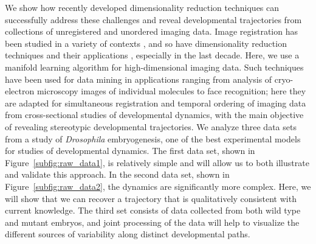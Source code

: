 \documentclass{pnastwo}
\begin{document}
\begin{article}
We show how recently developed dimensionality reduction techniques can successfully address these challenges and reveal developmental trajectories from collections of unregistered and unordered imaging data.
%
Image registration has been studied in a variety of contexts \cite{zitova2003image, rowley1998rotation, hajnal2010medical, greenspan1994rotation, zhao2003face}, and so have dimensionality reduction techniques \cite{Belkin2003, coifman2005geometric, coifman2006geometric, tenenbaum2000global, roweis2000nonlinear} and their applications \cite{anavy2014blind, trapnell2014dynamics,gupta2008extracting, qiu2011discovering, kafri2013dynamics}, especially in the last decade.
%
Here, we use a manifold learning algorithm \cite{singer2012vector} for high-dimensional imaging data.%
%
Such techniques have been used for data mining in 
applications ranging from analysis of cryo-electron microscopy images of individual molecules to face recognition; here they are adapted
for simultaneous registration and temporal ordering of imaging data from cross-sectional studies of developmental dynamics, with the main objective of revealing stereotypic developmental trajectories.
%
We analyze three data sets from a study of {\it Drosophila} embryogenesis, one of the best experimental models for studies of developmental dynamics.
%
The first data set, shown in Figure~\ref{subfig:raw_data1}, is relatively simple and will allow us to both illustrate and validate this approach.
%
In the second data set, shown in Figure~\ref{subfig:raw_data2}, the dynamics are significantly more complex.
%
Here, we will show that we can recover a trajectory that is qualitatively consistent with current knowledge.
%
The third set consists of data collected from both wild type and mutant embryos, and joint processing of the data will help to visualize the different sources of variability along distinct developmental paths.

%
%
%
%



\end{article}
\end{document}
